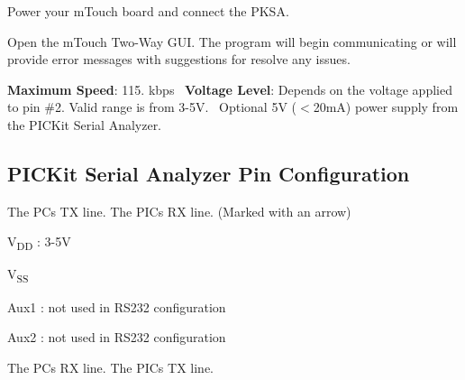 \begin{DoxyEnumerate}
\item Power your m\+Touch board and connect the P\+K\+S\+A. 
\item Open the m\+Touch Two-\/\+Way G\+U\+I. The program will begin communicating or will provide error messages with suggestions for resolve any issues. 
\end{DoxyEnumerate}

 {\bfseries Maximum Speed}\+: 115. kbps~\newline
 {\bfseries Voltage Level}\+: Depends on the voltage applied to pin \#2. Valid range is from 3-\/5\+V.~\newline
 Optional 5\+V ($<$20m\+A) power supply from the P\+I\+C\+Kit Serial Analyzer.~\newline
\hypertarget{_p_k_s_a_r_s232_Pinout}{}\subsection{P\+I\+C\+Kit Serial Analyzer Pin Configuration}\label{_p_k_s_a_r_s232_Pinout}

\begin{DoxyEnumerate}
\item The P\+C\textquotesingle{}s T\+X line. The P\+I\+C\textquotesingle{}s R\+X line. (Marked with an arrow) 
\item V\textsubscript{D\+D} \+: 3-\/5\+V 
\item V\textsubscript{S\+S} 
\item Aux1 \+: not used in R\+S232 configuration 
\item Aux2 \+: not used in R\+S232 configuration 
\item The P\+C\textquotesingle{}s R\+X line. The P\+I\+C\textquotesingle{}s T\+X line. 
\end{DoxyEnumerate} 